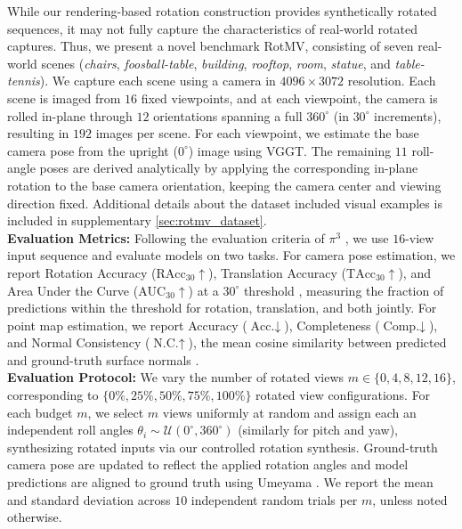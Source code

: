 While our rendering-based rotation construction provides synthetically rotated sequences, it may not fully capture the characteristics of real-world rotated captures. 
Thus, we present a novel benchmark RotMV, consisting of seven real-world scenes (\textit{chairs}, \textit{foosball-table}, \textit{building}, \textit{rooftop}, \textit{room}, \textit{statue}, and \textit{table-tennis}). 
We capture each scene using a camera  in $4096\times3072$ resolution. 
Each scene is imaged from $16$ fixed viewpoints, and at each viewpoint, the camera is rolled in-plane through $12$ orientations spanning a full $360^\circ$ (in $30^\circ$ increments), resulting in $192$ images per scene.
For each viewpoint, we estimate the base camera pose from the upright ($0^\circ$) image using VGGT. 
The remaining $11$ roll-angle poses are derived analytically by applying the corresponding in-plane rotation to the base camera orientation, keeping the camera center and viewing direction fixed. Additional details about the dataset included visual examples is included in supplementary \cref{sec:rotmv_dataset}.
\\
\textbf{Evaluation Metrics:} 
Following the evaluation criteria of $\pi^3$ \citep{wang2025pi}, we use $16$-view input sequence and evaluate models on two tasks. For camera pose estimation, we report Rotation Accuracy ($\text{RAcc}_{30}$$\uparrow$), Translation Accuracy ($\text{TAcc}_{30}$$\uparrow$), and Area Under the Curve ($\text{AUC}_{30}$$\uparrow$) at a $30^\circ$ threshold \citep{wang2023posediffusion}, measuring the fraction of predictions within the threshold for rotation, translation, and both jointly. For point map estimation, we report Accuracy ($\text{Acc.}\downarrow$), Completeness ($\text{Comp.}\downarrow$), and Normal Consistency ($\text{N.C.}\uparrow$), the mean cosine similarity between predicted and ground-truth surface normals \citep{mast3r_eccv24}. 
\\
\textbf{Evaluation Protocol:} We vary the number of rotated views $m \in \{0, 4, 8, 12, 16\}$, corresponding to $\{0\%, 25\%, 50\%, 75\%, 100\%\}$ rotated view configurations. For each budget $m$, we select $m$ views uniformly at random and assign each an independent roll angles $\theta_i \sim \mathcal{U}(0^\circ, 360^\circ)$ (similarly for pitch and yaw), synthesizing rotated inputs via our controlled rotation synthesis. Ground-truth camera pose are updated to reflect the applied rotation angles and model predictions are aligned to ground truth using Umeyama \citep{umeyamaalgo}. We report the mean and standard deviation across $10$ independent random trials per $m$, unless noted otherwise. 

